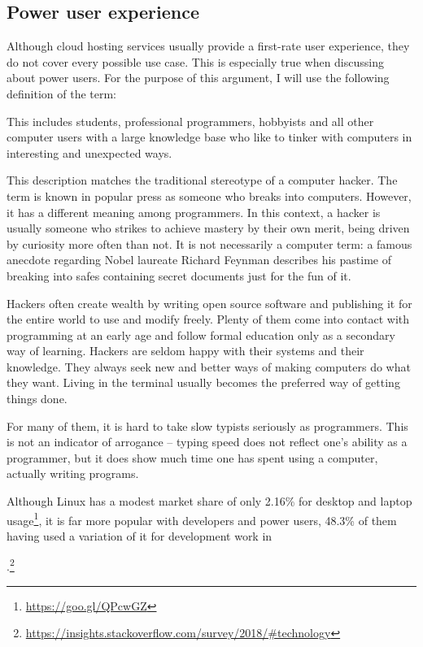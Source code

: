 \subsection{Power user experience} \label{power_user_experience}

Although cloud hosting services usually provide a first-rate user experience, they do not cover every possible use case. This is especially true when discussing about power users. For the purpose of this argument, I will use the following definition of the term:


This includes students, professional programmers, hobbyists and all other computer users with a large knowledge base who like to tinker with computers in interesting and unexpected ways.

This description matches the traditional stereotype of a computer hacker. The term is known in popular press as someone who breaks into computers. However, it has a different meaning among programmers. In this context, a hacker is usually someone who strikes to achieve mastery by their own merit, being driven by curiosity more often than not. It is not necessarily a computer term: a famous anecdote regarding Nobel laureate Richard Feynman describes his pastime of breaking into safes containing secret documents just for the fun of it\cite{feynman}.

Hackers often create wealth by writing open source software and publishing it for the entire world to use and modify freely\cite{hackers_and_painters}. Plenty of them come into contact with programming at an early age and follow formal education only as a secondary way of learning. Hackers are seldom happy with their systems and their knowledge. They always seek new and better ways of making computers do what they want. Living in the terminal usually becomes the preferred way of getting things done.

For many of them, it is hard to take slow typists seriously as programmers. This is not an indicator of arrogance -- typing speed does not reflect one's ability as a programmer, but it does show much time one has spent using a computer, actually writing programs.

Although Linux has a modest market share of only 2.16\% for desktop and laptop usage\footnote{\url{https://goo.gl/QPcwGZ}}, it is far more popular with developers and power users, 48.3\% of them having used a variation of it for development work in \date{2018}.\footnote{\url{https://insights.stackoverflow.com/survey/2018/#technology}}

